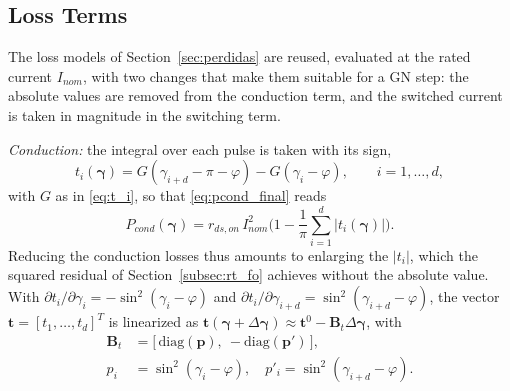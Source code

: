 \documentclass[conference]{IEEEtran}
\newcommand{\gv}{\boldsymbol{\gamma}}
\begin{document}
\subsection{Loss Terms}
\label{subsec:rt_loss}

The loss models of Section~\ref{sec:perdidas} are reused, evaluated at the
rated current $I_{nom}$, with two changes that make them suitable for a GN
step: the absolute values are removed from the conduction term, and the
switched current is taken in magnitude in the switching term.

\textit{Conduction:} the integral over each pulse is taken with its sign,
%
\begin{equation}
  t_i(\gv) = G(\gamma_{i+d}-\pi-\varphi) - G(\gamma_i-\varphi),
  \qquad i = 1,\dots,d,
  \label{eq:rt_T}
\end{equation}
%
with $G$ as in \eqref{eq:t_i}, so that \eqref{eq:pcond_final} reads
%
\begin{equation}
  P_{cond}(\gv) = r_{ds,on}\,I_{nom}^2
  \Big(1 - \frac{1}{\pi}\sum_{i=1}^{d} |t_i(\gv)|\Big).
  \label{eq:rt_pcond}
\end{equation}
%
Reducing the conduction losses thus amounts to enlarging the $|t_i|$,
which the squared residual of Section~\ref{subsec:rt_fo} achieves without
the absolute value. With
$\partial t_i/\partial\gamma_i = -\sin^2(\gamma_i-\varphi)$ and
$\partial t_i/\partial\gamma_{i+d} = \sin^2(\gamma_{i+d}-\varphi)$, the
vector $\mathbf{t} = [t_1,\dots,t_d]^T$ is linearized as
$\mathbf{t}(\gv+\Delta\gv) \approx \mathbf{t}^0 - \mathbf{B}_t\Delta\gv$,
with
%
\begin{align}
  \mathbf{B}_t &= \big[\,\mathrm{diag}(\mathbf{p}),\
                  -\mathrm{diag}(\mathbf{p}')\,\big], \nonumber\\
  p_i &= \sin^2(\gamma_i-\varphi), \quad
  p'_i = \sin^2(\gamma_{i+d}-\varphi).
  \label{eq:rt_BP}
\end{align}
\end{document}
